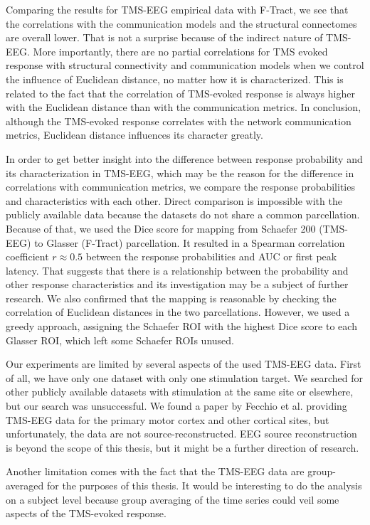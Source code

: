 Comparing the results for TMS-EEG empirical data with F-Tract, we see that the correlations with the communication models and the structural connectomes are overall lower. That is not a surprise because of the indirect nature of TMS-EEG. More importantly, there are no partial correlations for TMS evoked response with structural connectivity and communication models when we control the influence of Euclidean distance, no matter how it is characterized. This is related to the fact that the correlation of TMS-evoked response is always higher with the Euclidean distance than with the communication metrics. In conclusion, although the TMS-evoked response correlates with the network communication metrics, Euclidean distance influences its character greatly.

In order to get better insight into the difference between response probability and its characterization in TMS-EEG, which may be the reason for the difference in correlations with communication metrics, we compare the response probabilities and characteristics with each other. Direct comparison is impossible with the publicly available data because the datasets do not share a common parcellation. Because of that, we used the Dice score for mapping from Schaefer 200 (TMS-EEG) to Glasser (F-Tract) parcellation. It resulted in a Spearman correlation coefficient $r\approx0.5$ between the response probabilities and AUC or first peak latency. That suggests that there is a relationship between the probability and other response characteristics and its investigation may be a subject of further research. We also confirmed that the mapping is reasonable by checking the correlation of Euclidean distances in the two parcellations. However, we used a greedy approach, assigning the Schaefer ROI with the highest Dice score to each Glasser ROI, which left some Schaefer ROIs unused. 

Our experiments are limited by several aspects of the used TMS-EEG data. First of all, we have only one dataset with only one stimulation target. We searched for other publicly available datasets with stimulation at the same site or elsewhere, but our search was unsuccessful. We found a paper by Fecchio et al. \cite{fecchio_spectral_2017} providing TMS-EEG data for the primary motor cortex and other cortical sites, but unfortunately, the data are not source-reconstructed. EEG source reconstruction is beyond the scope of this thesis, but it might be a further direction of research.

Another limitation comes with the fact that the TMS-EEG data are group-averaged for the purposes of this thesis. It would be interesting to do the analysis on a subject level because group averaging of the time series could veil some aspects of the TMS-evoked response.

